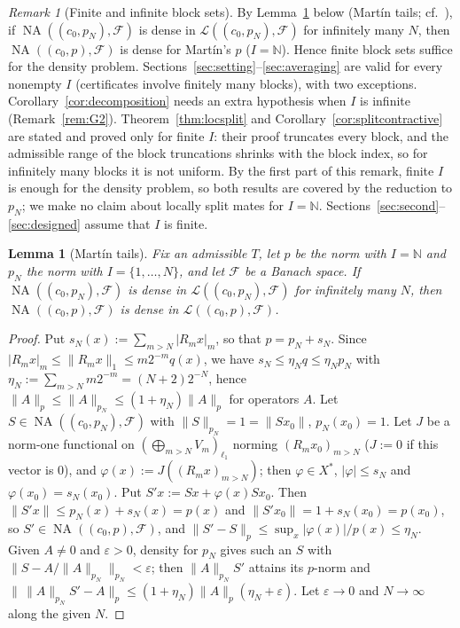 \documentclass[10pt]{amsart}
\newtheorem{lemma}[theorem]{Lemma}
\theoremstyle{definition}
\theoremstyle{remark}
\newtheorem{remark}[theorem]{Remark}
\newcommand{\NA}{\operatorname{NA}}
\newcommand{\N}{\mathbb N}
\begin{document}
\begin{remark}[Finite and infinite block sets]\label{rem:blocks}
By Lemma~\ref{lem:martintail} below (Mart\'in tails; cf.\
\cite[Remark~6.9]{PrB}), if $\NA((c_0,p_N),\mathcal F)$ is dense in
$\mathcal L((c_0,p_N),\mathcal F)$ for infinitely many $N$, then
$\NA((c_0,p),\mathcal F)$ is dense for Mart\'in's $p$ ($I=\N$).  Hence
finite block sets suffice for the density problem.  Sections~\ref{sec:setting}--\ref{sec:averaging} are
valid for every nonempty $I$ (certificates involve finitely many blocks),
with two exceptions.  Corollary~\ref{cor:decomposition} needs an extra
hypothesis when $I$ is infinite (Remark~\ref{rem:G2}).
Theorem~\ref{thm:locsplit} and Corollary~\ref{cor:splitcontractive} are
stated and proved only for finite $I$: their proof truncates every block,
and the admissible range of the block truncations shrinks with the block
index, so for infinitely many blocks it is not uniform.  By the first
part of this remark, finite $I$ is enough for the density problem, so
both results are covered by the reduction to $p_N$; we make no claim about
locally split mates for $I=\N$.  Sections~\ref{sec:second}--\ref{sec:designed} assume that $I$ is finite.
\end{remark}

\begin{lemma}[Mart\'in tails]\label{lem:martintail}
Fix an admissible $T$, let $p$ be the norm with $I=\N$ and $p_N$ the norm
with $I=\{1,\dots,N\}$, and let $\mathcal F$ be a Banach space.  If
$\NA((c_0,p_N),\mathcal F)$ is dense in $\mathcal L((c_0,p_N),\mathcal F)$
for infinitely many $N$, then $\NA((c_0,p),\mathcal F)$ is dense in
$\mathcal L((c_0,p),\mathcal F)$.
\end{lemma}

\begin{proof}
Put $s_N(x):=\sum_{m>N}|R_mx|_m$, so that $p=p_N+s_N$.  Since
$|R_mx|_m\le\|R_mx\|_1\le m2^{-m}q(x)$, we have $s_N\le\eta_Nq\le\eta_Np_N$
with $\eta_N:=\sum_{m>N}m2^{-m}=(N+2)2^{-N}$, hence $\|A\|_p\le\|A\|_{p_N}\le
(1+\eta_N)\|A\|_p$ for operators $A$.  Let $S\in\NA((c_0,p_N),\mathcal F)$
with $\|S\|_{p_N}=1=\|Sx_0\|$, $p_N(x_0)=1$.  Let $J$ be a norm-one
functional on $(\bigoplus_{m>N}V_m)_{\ell_1}$ norming $(R_mx_0)_{m>N}$
($J:=0$ if this vector is $0$), and $\varphi(x):=J((R_mx)_{m>N})$; then
$\varphi\in X^*$, $|\varphi|\le s_N$ and $\varphi(x_0)=s_N(x_0)$.  Put
$S'x:=Sx+\varphi(x)Sx_0$.  Then $\|S'x\|\le p_N(x)+s_N(x)=p(x)$ and
$\|S'x_0\|=1+s_N(x_0)=p(x_0)$, so $S'\in\NA((c_0,p),\mathcal F)$, and
$\|S'-S\|_p\le\sup_x|\varphi(x)|/p(x)\le\eta_N$.  Given $A\ne0$ and
$\varepsilon>0$, density for $p_N$ gives such an $S$ with
$\|S-A/\|A\|_{p_N}\|_{p_N}<\varepsilon$; then $\|A\|_{p_N}S'$ attains its
$p$-norm and $\|\,\|A\|_{p_N}S'-A\|_p\le(1+\eta_N)\|A\|_p(\eta_N+
\varepsilon)$.  Let $\varepsilon\to0$ and $N\to\infty$ along the given
$N$.
\end{proof}
\end{document}
